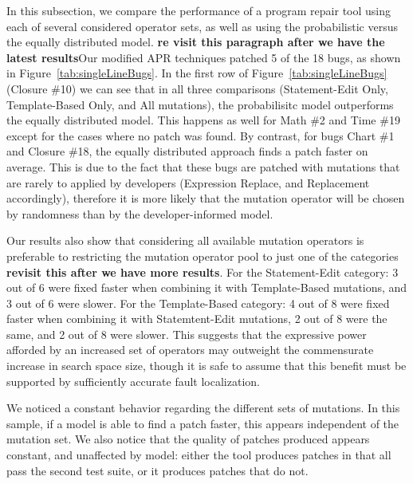 \documentclass[conference]{IEEEtran}
\newcommand{\todo}[1]
  {{\scriptsize \textbf{\color{red} {#1}}}}
\begin{document}
In this subsection, we compare the performance of a program repair tool using
each of several considered operator sets, as well as using the probabilistic
versus the equally distributed model. 
\todo{re visit this paragraph after we have the latest results}Our modified APR techniques patched 5 of the 18 bugs, as shown in 
Figure~\ref{tab:singleLineBugs}. In the first row of Figure~\ref{tab:singleLineBugs} (Closure \#10) we can see
that in all three comparisons (Statement-Edit Only, Template-Based Only, and All
mutations), the probabilisitc model outperforms
the equally distributed model. This happens as well for
Math \#2 and Time \#19 except for the cases where no patch was
found. By contrast, for bugs Chart \#1 and Closure \#18, the equally
distributed approach finds a patch faster on average. This is due to the fact
that these bugs are patched with mutations that are rarely to applied by developers (Expression Replace, and Replacement accordingly),
therefore it is more likely that the mutation operator will be chosen by randomness
than by the developer-informed model.

Our results also show that considering all available mutation operators is
preferable to 
restricting the mutation operator pool to just one of the categories \todo{revisit this after we have more results}. For the
Statement-Edit category: 3 out of 6 were fixed faster when combining it with
Template-Based mutations, and 3 out of 6 were slower. For the Template-Based
category: 4 out of 8 were fixed faster when combining it with Statemtent-Edit
mutations, 2 out of 8 were the same, and 2 out of 8 were slower. This suggests
that the expressive power afforded by an increased set of operators may
outweight the commensurate increase in search space size, though it is safe to
assume that this benefit must be supported by sufficiently accurate fault
localization. 

We noticed a
constant behavior regarding the different sets of mutations. In this sample, if
a model is able to find a patch faster, this appears independent of the mutation
set.  We also notice that
the quality of patches produced  appears constant, and unaffected by model:
either the tool produces patches in 
that all pass the second test suite, or it produces patches that do not. 
\end{document}
